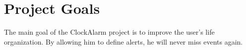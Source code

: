 \section{Project Goals}

The main goal of the ClockAlarm project is to improve the user's life
organization. By allowing him to define alerts, he will never miss events
again.
